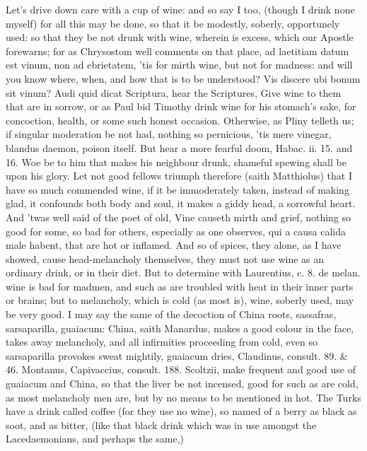 Let's drive down care with a cup of wine: and so say I too, (though I
drink none myself) for all this may be done, so that it be modestly,
soberly, opportunely used: so that they be not drunk with wine, wherein
is excess, which our Apostle forewarns; for as Chrysostom well
comments on that place, ad laetitiam datum est vinum, non ad
ebrietatem, 'tis for mirth wine, but not for madness: and will you know
where, when, and how that is to be understood? Vis discere ubi bonum
sit vinum? Audi quid dicat Scriptura, hear the Scriptures, Give wine to
them that are in sorrow, or as Paul bid Timothy drink wine for his
stomach's sake, for concoction, health, or some such honest occasion.
Otherwise, as  Pliny telleth us; if singular moderation be not
had, nothing so pernicious, 'tis mere vinegar, blandus daemon,
poison itself. But hear a more fearful doom, Habac. ii. 15. and 16. Woe
be to him that makes his neighbour drunk, shameful spewing shall be
upon his glory. Let not good fellows triumph therefore (saith
Matthiolus) that I have so much commended wine, if it be immoderately
taken, instead of making glad, it confounds both body and soul, it
makes a giddy head, a sorrowful heart. And 'twas well said of the poet
of old, Vine causeth mirth and grief, nothing so good for some,
so bad for others, especially as one observes, qui a causa calida
male habent, that are hot or inflamed. And so of spices, they alone, as
I have showed, cause head-melancholy themselves, they must not use wine
as an ordinary drink, or in their diet. But to determine with
Laurentius, c. 8. de melan. wine is bad for madmen, and such as are
troubled with heat in their inner parts or brains; but to melancholy,
which is cold (as most is), wine, soberly used, may be very good.
I may say the same of the decoction of China roots, sassafras,
sarsaparilla, guaiacum: China, saith Manardus, makes a good colour in
the face, takes away melancholy, and all infirmities proceeding from
cold, even so sarsaparilla provokes sweat mightily, guaiacum dries,
Claudinus, consult. 89. \& 46. Montanus, Capivaccius, consult. 188.
Scoltzii, make frequent and good use of guaiacum and China, so
that the liver be not incensed, good for such as are cold, as most
melancholy men are, but by no means to be mentioned in hot.
The Turks have a drink called coffee (for they use no wine), so named
of a berry as black as soot, and as bitter, (like that black drink
which was in use amongst the Lacedaemonians, and perhaps the same,)
